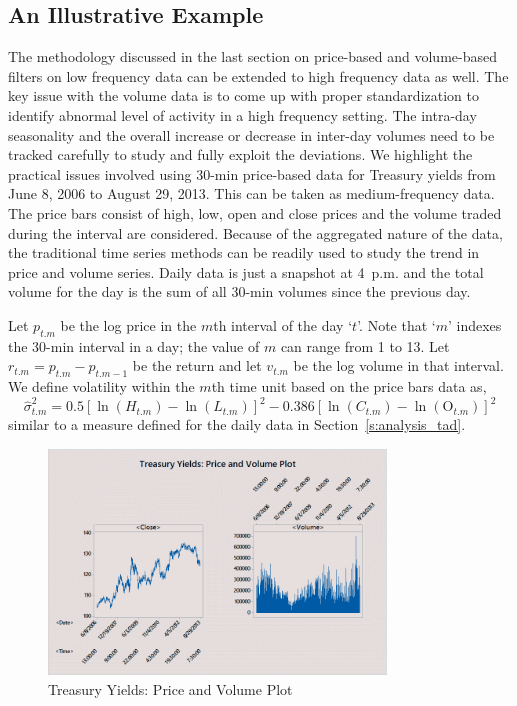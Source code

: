 \subsection{An Illustrative Example \label{sec:illus_ex}}

The methodology discussed in the last section on price-based and volume-based filters on low frequency data can be extended to high frequency data as well. The key issue with the volume data is to come up with proper standardization to identify abnormal level of activity in a high frequency setting. The intra-day seasonality and the overall increase or decrease in inter-day volumes need to be tracked carefully to study and fully exploit the deviations. We highlight the practical issues involved using 30-min price-based data for Treasury yields from June 8, 2006 to August 29, 2013. This can be taken as medium-frequency data. The price bars consist of high, low, open and close prices and the volume traded during the interval are considered. Because of the aggregated nature of the data, the traditional time series methods can be readily used to study the trend in price and volume series. Daily data is just a snapshot at 4~p.m. and the total volume for the day is the sum of all 30-min volumes since the previous day.


Let $p_{t.m}$ be the log price in the $m$th interval of the day `$t$'. Note that `$m$' indexes the 30-min interval in a day; the value of $m$ can range from 1 to 13. Let $r_{t.m}= p_{t.m} - p_{t.m-1}$ be the return and let $v_{t.m}$ be the log volume in that interval. We define volatility within the $m$th time unit based on the price bars data as,
	\begin{equation} \label{eqn:hatsigmasq}
	\hat{\sigma}_{t. m}^2= 0.5 [ \ln(H_{t. m}) - \ln(L_{t.m})]^2 - 0.386[\ln(C_{t.m}) - \ln(\text{O}_{t . m})]^2
	\end{equation}
similar to a measure defined for the daily data in Section~\ref{s:analysis_tad}.

        \begin{figure}[!ht]
        \centering
        \includegraphics[width=0.8\textwidth]{chapters/chapter_stat_ts/figures/treasury.png}
        \caption{Treasury Yields: Price and Volume Plot \label{fig:treasuryyields}}
        \end{figure}
        

